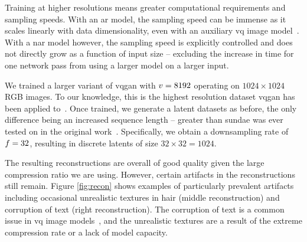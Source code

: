 Training at higher resolutions means greater computational requirements and
sampling speeds. With an \gls{ar} model, the sampling speed can be
immense as it scales linearly with data dimensionality, even with an
auxiliary \gls{vq} image model~\cite{esser2021taming}. With a
\gls{nar} model however, the sampling speed is explicitly controlled
and does not directly grow as a function of input size -- excluding the
increase in time for one network pass from using a larger model on a larger input.

We trained a larger variant of \gls{vqgan} with $v = 8192$ operating on
$1024 \times 1024$ RGB images. To our knowledge, this is the highest resolution
dataset \gls{vqgan} has been applied to~\cite{esser2021taming}. Once trained,
we generate a latent datasets as before, the only difference being an increased
sequence length -- greater than \gls{sundae} was ever tested on in the original
work~\cite{savinov2022stepunrolled}. Specifically, we obtain a downsampling rate
of $f=32$, resulting in discrete latents of size $32 \times 32 =
1024$.

The resulting reconstructions are overall of good quality given the 
large compression ratio we are using. However, certain artifacts in the
reconstructions still remain. Figure \ref{fig:recon} shows examples of
particularly prevalent artifacts including occasional unrealistic textures in
hair (middle reconstruction) and corruption of text (right reconstruction). The
corruption of text is a common issue in \gls{vq} image
models~\cite{ramesh2021dalle}, and the unrealistic textures are a result of the
extreme compression rate or a lack of model capacity.

